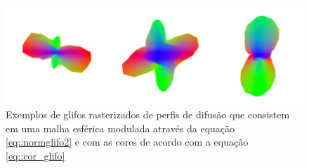 \documentclass[
    12pt,                %
    oneside,            %
    a4paper,            %
    english,            %
    french,                %
    spanish,            %
    brazil                %
    ]{abntex2}
\begin{document}
\begin{figure}[ht]

    \centering
    \includegraphics[width=.8\linewidth, angle=0]{figs/Esquema_Glifo/Glifos3Ex.png}
    \caption{Exemplos de glifos rasterizados de perfis de difusão que consistem em uma malha esférica modulada através da equação \ref{eq::normglifo2} e com as cores de acordo com a equação \ref{eq::cor_glifo}}
    \label{fig::glifo_ilustrado}
   \hspace{1pt}
\end{figure}










\end{document}
